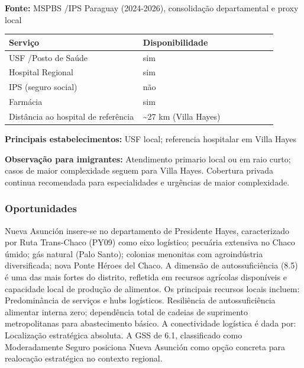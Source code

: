 \textbf{Fonte:} MSPBS /\allowbreak  IPS Paraguay (2024-2026), consolidação
departamental e proxy local

{\def\LTcaptype{none} %
\begin{longtable}{@{}>{\raggedright\arraybackslash}p{0.45\linewidth} >{\raggedright\arraybackslash}p{0.45\linewidth}@{}}
\toprule\noalign{}
Serviço & Disponibilidade \\
\midrule\noalign{}
\endhead
\bottomrule\noalign{}
\endlastfoot
USF /\allowbreak  Posto de Saúde & sim \\
Hospital Regional & sim \\
IPS (seguro social) & não \\
Farmácia & sim \\
Distância ao hospital de referência & \textasciitilde27 km (Villa
Hayes) \\
\end{longtable}
}

\textbf{Principais estabelecimentos:} USF local; referencia hospitalar
em Villa Hayes

\textbf{Observação para imigrantes:} Atendimento primario local ou em
raio curto; casos de maior complexidade seguem para Villa Hayes.
Cobertura privada continua recomendada para especialidades e urgências
de maior complexidade.
\newpage

\subsubsection*{Oportunidades}\label{oport-nueva-asuncion-1511}
Nueva Asunción insere-se no departamento de Presidente Hayes, caracterizado por Ruta Trans-Chaco (PY09) como eixo logístico; pecuária extensiva no Chaco úmido; gás natural (Palo Santo); colonias menonitas com agroindústria diversificada; nova Ponte Héroes del Chaco. A dimensão de autossuficiência (8.5) é uma das mais fortes do distrito, refletida em recursos agrícolas disponíveis e capacidade local de produção de alimentos. Os principais recursos locais incluem: Predominância de serviços e hubs logísticos. Resiliência de autossuficiência alimentar interna zero; dependência total de cadeias de suprimento metropolitanas para abastecimento básico. A conectividade logística é dada por: Localização estratégica absoluta. A GSS de 6.1, classificado como Moderadamente Seguro posiciona Nueva Asunción como opção concreta para realocação estratégica no contexto regional.

